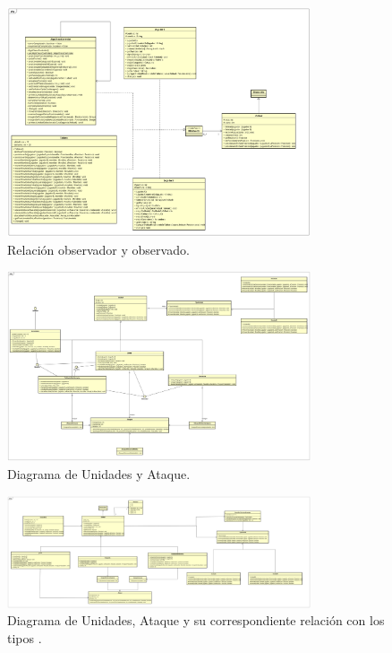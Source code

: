 \documentclass[titlepage,a4paper]{article}
\begin{document}
\begin{figure}[H]
\centering
\includegraphics[width=0.8\textwidth]{DiagramasDeSecuencia/ObserverObservador.png}
\caption{\label{fig:class01p}Relación observador y observado.}
\end{figure}

\begin{figure}[H]
\centering
\includegraphics[width=0.8\textwidth]{DiagramasDeClases/28-nov clases entidades y ataque.jpg}
\caption{\label{fig:class01o}Diagrama de Unidades y Ataque.}
\end{figure}

\begin{figure}[H]
\centering
\includegraphics[width=0.8\textwidth]{DiagramasDeSecuencia/EntidadesAtaquesTipos.png}
\caption{\label{fig:class01i}Diagrama de Unidades, Ataque y su correspondiente relación con los tipos .}
\end{figure}
\end{document}
